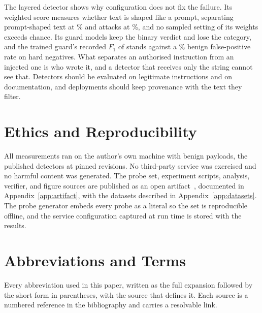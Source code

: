 \documentclass[conference]{IEEEtran}
\begin{document}
The layered detector shows why configuration does not fix the failure. Its
weighted score measures whether text is shaped like a prompt, separating
prompt-shaped text at \AurocScorePrompt{}\% and attacks at
\AurocScoreAttack{}\%, and no sampled setting of its weights exceeds chance.
Its guard models keep the binary verdict and lose the category, and the
trained guard's recorded $F_1$ of \ReportedFOneTr{} stands against a
\BinFprTr{}\% benign false-positive rate on hard negatives. What separates an
authorised instruction from an injected one is who wrote it, and a detector
that receives only the string cannot see that. Detectors should be evaluated
on legitimate instructions and on documentation, and deployments should keep
provenance with the text they filter.

\section*{Ethics and Reproducibility}

All measurements ran on the author's own machine with benign payloads, the
published detectors at pinned revisions. No third-party service was exercised and no harmful
content was generated. The probe set, experiment scripts, analysis, verifier,
and figure sources are published as an open
artifact~\cite{rashidi2026artifact}, documented in
Appendix~\ref{app:artifact}, with the datasets described in
Appendix~\ref{app:datasets}. The probe generator embeds every probe as a
literal so the set is reproducible offline, and the service configuration
captured at run time is stored with the results.




\appendices

\section{Abbreviations and Terms}\label{app:abbrev}

Every abbreviation used in this paper, written as the full expansion followed
by the short form in parentheses, with the source that defines it. Each source
is a numbered reference in the bibliography and carries a resolvable link.
\end{document}
